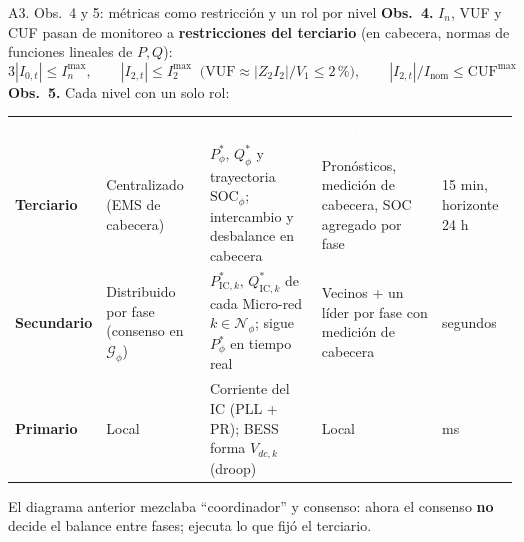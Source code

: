 \documentclass[aspectratio=169,10pt,t]{beamer}
\newcommand{\thead}{\rowcolor{usachO}}
\newcommand{\Th}[1]{\textcolor{white}{\textbf{#1}}}
\newcommand{\Pic}[1]{P_{\mathrm{IC},#1}}
\newcommand{\Qic}[1]{Q_{\mathrm{IC},#1}}
\newcommand{\Nset}[1]{\mathcal{N}_{#1}}
\begin{document}
\begin{frame}{A3. Obs.\ 4 y 5: métricas como restricción y un rol por nivel}
  \footnotesize
  \textbf{Obs.\ 4.} $I_n$, VUF y CUF pasan de monitoreo a \textbf{restricciones del terciario} (en cabecera, normas de funciones lineales de $P,Q$):
  \[ 3|I_{0,t}|\le I_n^{\max},\qquad |I_{2,t}|\le I_2^{\max}\;\;\big(\text{VUF}\approx|Z_2 I_2|/V_1\le 2\,\%\big),\qquad |I_{2,t}|/I_{\mathrm{nom}}\le \mathrm{CUF}^{\max}\]
  \textbf{Obs.\ 5.} Cada nivel con un solo rol:\\[3pt]
  \scriptsize\renewcommand{\arraystretch}{1.25}
  \begin{tabularx}{\textwidth}{@{}p{1.45cm}p{1.9cm}X p{2.5cm}p{1.35cm}@{}}
    \thead \Th{Nivel} & \Th{Estructura} & \Th{Decide} & \Th{Información} & \Th{Escala} \\
    \textbf{Terciario} & Centralizado (EMS de cabecera) & $P^*_\phi,\,Q^*_\phi$ y trayectoria $\mathrm{SOC}_\phi$; intercambio y desbalance en cabecera & Pronósticos, medición de cabecera, SOC agregado por fase & 15 min, horizonte 24 h \\
    \textbf{Secundario} & Distribuido por fase (consenso en $\mathcal G_\phi$) & $\Pic{k}^*,\,\Qic{k}^*$ de cada Micro-red $k\in\Nset{\phi}$; sigue $P^*_\phi$ en tiempo real & Vecinos + un líder por fase con medición de cabecera & segundos \\
    \textbf{Primario} & Local & Corriente del IC (PLL + PR); BESS forma $V_{dc,k}$ (droop) & Local & ms \\
  \end{tabularx}

  \vspace{4pt}
  \footnotesize El diagrama anterior mezclaba ``coordinador'' y consenso: ahora el consenso \textbf{no} decide el balance entre fases; ejecuta lo que fijó el terciario.
\end{frame}
\end{document}
